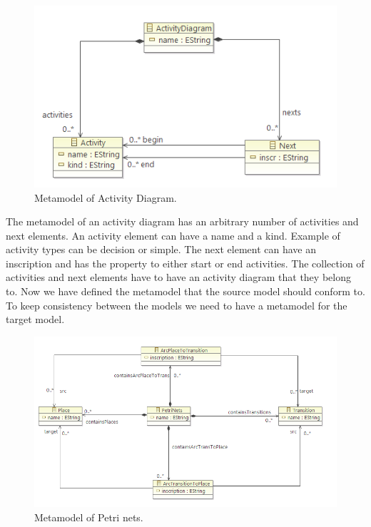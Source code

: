 \documentclass[pdftex,11pt,a4paper]{article}
\begin{document}
\begin{figure}[H]
	\centering
	\includegraphics[scale=0.5]{figures/ActivityMetamodel.png}
	\caption{Metamodel of Activity Diagram.}
	\label{fig:ActivityMetamodel}
\end{figure}

The metamodel of an activity diagram has an arbitrary number of activities and
next elements. An activity element can have a name and a kind. Example of
activity types can be decision or simple. The next element can have an
inscription and has the property to either start or end activities. The
collection of activities and next elements have to have an activity diagram
that they belong to. Now we have defined the metamodel that the source model
should conform to. To keep consistency between the models we need to have a
metamodel for the target model.

\begin{figure}[H]
	\centering
	\includegraphics[scale=0.5]{figures/PetriNetsMetamodel.png}
	\caption{Metamodel of Petri nets.}
	\label{fig:PetriNetsMetamodel}
\end{figure}
\end{document}
